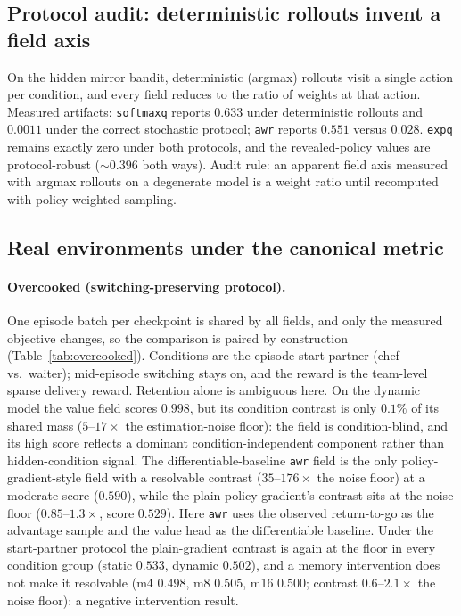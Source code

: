 \documentclass{article}
\begin{document}
\subsection{Protocol audit: deterministic rollouts invent a field axis}
\label{sec:exp-protocol}

On the hidden mirror bandit, deterministic (argmax) rollouts visit a single
action per condition, and every field reduces to the ratio of weights at that
action. Measured artifacts: \texttt{softmaxq} reports $0.633$ under
deterministic rollouts and $0.0011$ under the correct stochastic protocol;
\texttt{awr} reports $0.551$ versus $0.028$. \texttt{expq} remains exactly zero
under both protocols, and the revealed-policy values are protocol-robust
($\sim0.396$ both ways). Audit rule: an apparent field axis
measured with argmax rollouts on a degenerate model is a weight ratio until
recomputed with policy-weighted sampling.

\subsection{Real environments under the canonical metric}
\label{sec:exp-real}

\paragraph{Overcooked (switching-preserving protocol).}
One episode batch per checkpoint is shared by all fields, and only the
measured objective changes, so the comparison is paired by construction
(Table~\ref{tab:overcooked}). Conditions are the episode-start partner
(chef vs.\ waiter); mid-episode switching stays on, and the reward is the
team-level sparse delivery reward. Retention alone is ambiguous here. On the
dynamic model the value field scores $0.998$, but its condition contrast is
only $0.1\%$ of its shared mass ($5$--$17\times$ the estimation-noise
floor): the field is condition-blind, and its high score reflects a dominant
condition-independent component rather than hidden-condition signal. The
differentiable-baseline \texttt{awr} field is the only policy-gradient-style
field with a resolvable contrast ($35$--$176\times$ the noise floor) at a
moderate score ($0.590$), while the plain policy gradient's contrast sits at
the noise floor ($0.85$--$1.3\times$, score $0.529$). Here \texttt{awr} uses
the observed return-to-go as the advantage sample and the value head as the
differentiable baseline. Under the start-partner protocol the
plain-gradient contrast is again at the floor in every condition group
(static $0.533$, dynamic $0.502$), and a memory intervention does not make it
resolvable (m4 $0.498$, m8 $0.505$, m16 $0.500$; contrast $0.6$--$2.1\times$
the noise floor): a negative intervention result.
\end{document}
